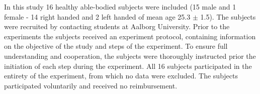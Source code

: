 In this study 16 healthy able-bodied subjects were included (15 male and 1 female - 14 right handed and 2 left handed of mean age 25.3 $\pm$ 1.5). The subjects were recruited by contacting students at Aalborg University. Prior to the experiments the subjects received an experiment protocol, containing information on the objective of the study and steps of the experiment. To ensure full understanding and cooperation, the subjects were thoroughly instructed prior the initiation of each step during the experiment. All 16 subjects participated in the entirety of the experiment, from which no data were excluded. The subjects participated voluntarily and received no reimbursement.